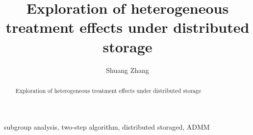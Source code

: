 \documentclass[review]{elsarticle}
\begin{document}
\begin{frontmatter}

\title{Exploration of heterogeneous treatment effects under distributed storage }

\author{Shuang Zhang}

\begin{abstract}
Exploration of heterogeneous treatment effects under distributed storage 
\end{abstract}

\begin{keyword}
subgroup analysis, two-step algorithm, distributed storaged, ADMM
\end{keyword}

\end{frontmatter}

\linenumbers
\end{document}
